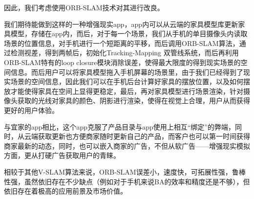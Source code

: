 因此，我们考虑使用ORB-SLAM技术对其进行改良。

我们期待能做到这样的一种增强现实app，app内可以从云端的家具模型库更新家具模型，存储在app内，而后，对于每一个场景，我们从手机的单目摄像头内读取场景的位置信息，对手机进行一个短距离的平移，而后调用ORB-SLAM算法，通过检测视差，得到两帧后，初始化Tracking-Mapping 双管线系统，而后再利用ORB-SLAM特有的loop closure模块消除误差，使得最大限度的得到现实场景的空间信息。而后用户可以将家具模型拖入手机屏幕的场景里，由于我们已经得到了现实场景的空间信息，因此我们可以在手机后台计算好家具的摆放位置，以及如何摆放才能使得家具在空间上显得更稳定，最后，再对家具模型进行场景渲染，针对摄像头获取的光线对家具的颜色、阴影进行渲染，使得在视觉上合理，用户从而获得更好的用户体验。

与宜家的app相比，这个app克服了产品目录与app使用上相互“绑定”的弊端，同时，从云端获取更新也方便商家随时更新自己的产品，而客户也可以第一时间获得商家最新的动态，同时，也可以嵌入商家的广告，不但从软广告——增强现实模拟方面，更从打硬广告获取用户的青睐。

相较于其他V-SLAM算法来说，ORB-SLAM误差小，速度快，可拓展性强，鲁棒性强，虽然依旧存在不少缺点（例如对于手机来说BA的效率和精度还是不够），但依旧存在着极高的应用前景及市场价值。

